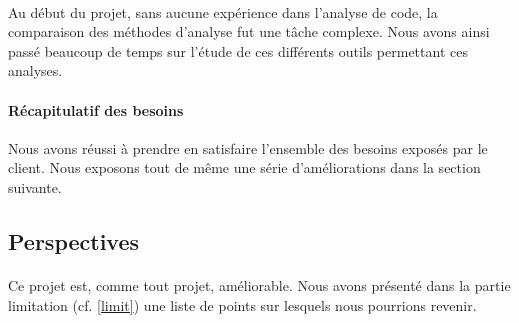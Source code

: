 \documentclass{scrartcl}
\begin{document}
    \paragraph{}Au début du projet, sans aucune expérience dans l'analyse de code, la comparaison des méthodes d'analyse fut une tâche complexe. Nous avons ainsi passé beaucoup de temps sur l'étude de ces différents outils permettant ces analyses.

    
    \paragraph{Récapitulatif des besoins}Nous avons réussi à prendre en satisfaire l'ensemble des besoins exposés par le client. Nous exposons tout de même une série d'améliorations dans la section suivante.
    

\subsection{Perspectives}
    
    \paragraph{}Ce projet est, comme tout projet, améliorable. Nous avons présenté dans la partie limitation (cf. \ref{limit}) une liste de points sur lesquels nous pourrions revenir.
    
\end{document}
